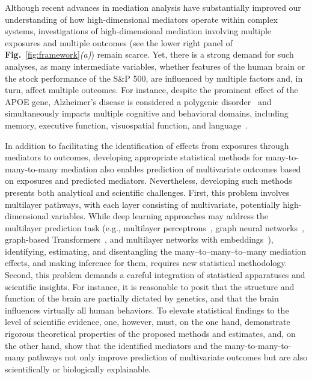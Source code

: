 \documentclass[
  12pt]{article}
\begin{document}
Although recent advances in mediation analysis have substantially improved our understanding of how high-dimensional mediators operate within complex systems, investigations of high-dimensional mediation involving multiple exposures and multiple outcomes (see the lower right panel of \textbf{Fig.}~\ref{fig:framework}\textit{(a)}) remain scarce. Yet, there is a strong demand for such analyses, as many intermediate variables, whether features of the human brain or the stock performance of the S\&P 500, are influenced by multiple factors and, in turn, affect multiple outcomes. For instance, despite the prominent effect of the APOE gene, Alzheimer's disease is considered a polygenic disorder~\citep{harrisonPolygenicScoresPrecision2020, bellenguez2022new} and simultaneously impacts multiple cognitive and behavioral domains, including memory, executive function, visuospatial function, and language~\citep{Diaz2025OPTIMUS}.

In addition to facilitating the identification of effects from exposures through mediators to outcomes, developing appropriate statistical methods for many-to-many-to-many mediation also enables prediction of multivariate outcomes based on exposures and predicted mediators. Nevertheless, developing such methods presents both analytical and scientific challenges. First, this problem involves multilayer pathways, with each layer consisting of multivariate, potentially high-dimensional variables. While deep learning approaches may address the multilayer prediction task (e.g., multilayer perceptrons~\citep{rumelhart1986learning}, graph neural networks~\citep{scarselli2008graph}, graph-based Transformers~\citep{ying2021transformers}, and multilayer networks with embeddings~\citep{guillemaud2025hyperbolic}), identifying, estimating, and disentangling the many--to--many--to--many mediation effects, and making inference for them, requires new statistical methodology. Second, this problem demands a careful integration of statistical apparatuses and scientific insights. For instance, it is reasonable to posit that the structure and function of the brain are partially dictated by genetics, and that the brain influences virtually all human behaviors. To elevate statistical findings to the level of scientific evidence, one, however, must, on the one hand, demonstrate rigorous theoretical properties of the proposed methods and estimates, and, on the other hand, show that the identified mediators and the many-to-many-to-many pathways not only improve prediction of multivariate outcomes but are also scientifically or biologically explainable.
\end{document}
